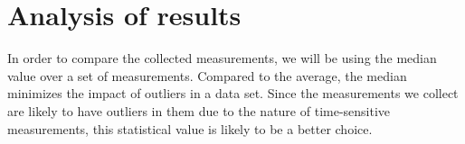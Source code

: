 \section{Analysis of results}
In order to compare the collected measurements, we will be using the median value over a set of measurements. Compared to the average, the median minimizes the impact of outliers in a data set. Since the measurements we collect are likely to have outliers in them due to the nature of time-sensitive measurements, this statistical value is likely to be a better choice.